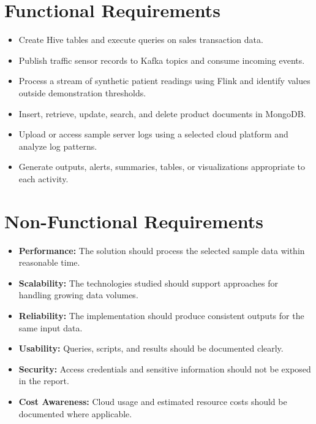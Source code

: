 \documentclass[12pt,a4paper]{report}
\begin{document}
\section{Functional Requirements}
\begin{itemize}
    \item Create Hive tables and execute queries on sales transaction data.
    \item Publish traffic sensor records to Kafka topics and consume incoming events.
    \item Process a stream of synthetic patient readings using Flink and identify values outside demonstration thresholds.
    \item Insert, retrieve, update, search, and delete product documents in MongoDB.
    \item Upload or access sample server logs using a selected cloud platform and analyze log patterns.
    \item Generate outputs, alerts, summaries, tables, or visualizations appropriate to each activity.
\end{itemize}

\section{Non-Functional Requirements}
\begin{itemize}
    \item \textbf{Performance:} The solution should process the selected sample data within reasonable time.
    \item \textbf{Scalability:} The technologies studied should support approaches for handling growing data volumes.
    \item \textbf{Reliability:} The implementation should produce consistent outputs for the same input data.
    \item \textbf{Usability:} Queries, scripts, and results should be documented clearly.
    \item \textbf{Security:} Access credentials and sensitive information should not be exposed in the report.
    \item \textbf{Cost Awareness:} Cloud usage and estimated resource costs should be documented where applicable.
\end{itemize}
\end{document}
